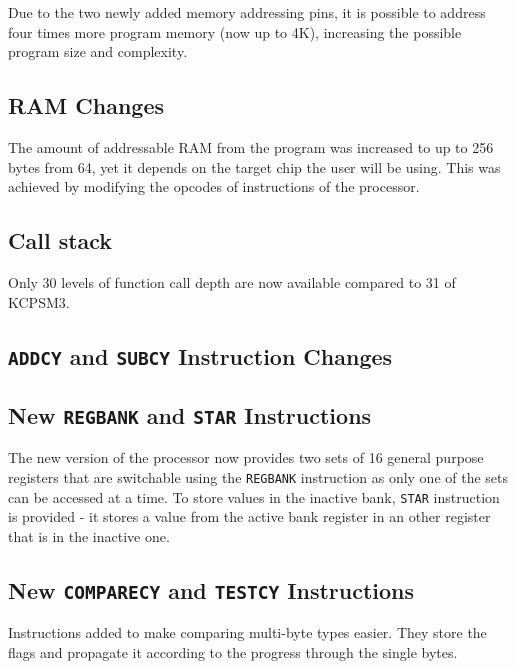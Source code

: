         Due to the two newly added memory addressing pins, it is possible to address four times more program memory (now up to 4K), increasing the possible program size and complexity.

        \subsection{RAM Changes}

        The amount of addressable RAM from the program was increased to up to 256 bytes from 64, yet it depends on the target chip the user will be using. This was achieved by modifying the opcodes of instructions of the processor.

        \subsection{Call stack}

        Only 30 levels of function call depth are now available compared to 31 of KCPSM3.

        \subsection{\texttt{ADDCY} and \texttt{SUBCY} Instruction Changes}

        

        \subsection{New \texttt{REGBANK} and \texttt{STAR} Instructions}

        The new version of the processor now provides two sets of 16 general purpose registers that are switchable using the \texttt{REGBANK} instruction as only one of the sets can be accessed at a time.
        To store values in the inactive bank, \texttt{STAR} instruction is provided - it stores a value from the active bank register in an other register that is in the inactive one.


        \subsection{New \texttt{COMPARECY} and \texttt{TESTCY} Instructions}

        Instructions added to make comparing multi-byte types easier. They store the flags and propagate it according to the progress through the single bytes.

